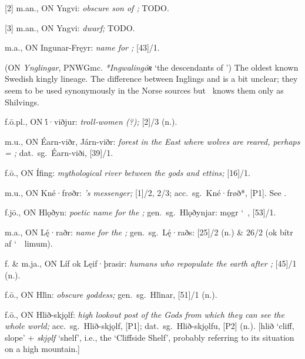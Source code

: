 \begin{itemize}
[2] m.an., ON Yngvi:
  \emph{obscure son of ;}  TODO.

[3] m.an., ON Yngvi:
  \emph{dwarf;}  TODO.

 m.a., ON Ingunar-Fręyr:
  \emph{name for ;} [43]/1.

 (ON \emph{Ynglingar}, PNWGmc. \emph{*Ingwalingóʀ} ‘the descendants of ’)
  The oldest known Swedish kingly lineage.  The difference between Inglings and  is a bit unclear; they seem to be used synonymously in the Norse sources but \Beowulf\ knows them only as Shilvings.

 f.ō.pl., ON i̇́·viðjur:
  \emph{troll-women (?);} [2]/3 (n.).

 m.u., ON Éarn-viðr, Járn-viðr:
  \emph{forest in the East where wolves are reared, perhaps = ;} dat.~sg.~Éarn-viði, [39]/1.

 f.ō., ON Ífing:
  \emph{mythological river between the gods and ettins;} [16]/1.

 m.u., ON Kné·frøðr:
  \emph{’s messenger;} [1]/2, 2/3; acc.~sg.~Kné·frøð*, [P1].  See .

 f.jō., ON Hlǫðyn:
  \emph{poetic name for the ;} gen.~sg.~Hlǫðynjar: mǫgr \char`~, [53]/1.

 m.a., ON Lę́·raðr:
  \emph{name for the ;} gen.~sg.~Lę́·raðs: [25]/2 (n.) \& 26/2 (ok bítr af \char`~\ limum).

 f. \& m.ja., ON Líf ok Lęif·þrasir:
  \emph{humans who repopulate the earth after ;} [45]/1 (n.).

 f.ō., ON Hli̇n:
  \emph{obscure goddess;} gen.~sg.~Hli̇nar, [51]/1 (n.).

 f.ō., ON Hlið-skjǫlf:
  \emph{high lookout post of the Gods from which they can see the whole world;} acc.~sg.~Hlið-skjǫlf, [P1]; dat.~sg.~Hlið-skjǫlfu, [P2] (n.).
  [hlið ‘cliff, slope’ + \emph{skjǫlf} ‘shelf’, i.e., the ‘Cliffside Shelf’, probably referring to its situation on a high mountain.]


\end{itemize}
